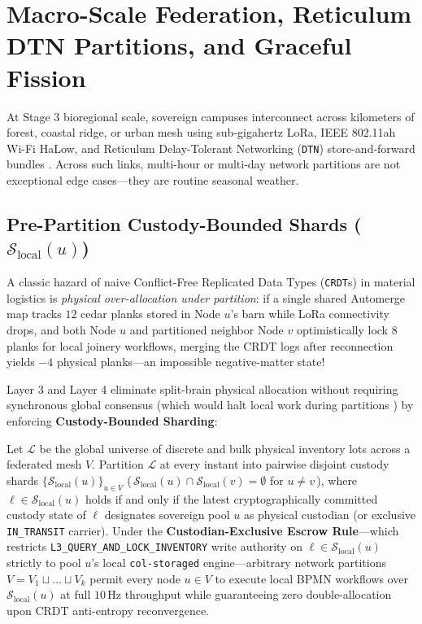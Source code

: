 \section{Macro-Scale Federation, Reticulum DTN Partitions, and Graceful Fission}
\label{sec:macro-scale-dtn-fission}

At Stage 3 bioregional scale, sovereign campuses interconnect across kilometers of forest,
coastal ridge, or urban mesh using sub-gigahertz LoRa, IEEE 802.11ah Wi-Fi HaLow, and Reticulum
Delay-Tolerant Networking (\texttt{DTN}) store-and-forward bundles \parencite{fall2003}. Across
such links, multi-hour or multi-day network partitions are not exceptional edge cases---they
are routine seasonal weather.

\subsection{Pre-Partition Custody-Bounded Shards ($\mathcal{S}_{\mathrm{local}}(u)$)}

A classic hazard of naive Conflict-Free Replicated Data Types (\texttt{CRDT}s)
\parencite{shapiro2011crdt} in material logistics is \emph{physical over-allocation under
partition}: if a single shared Automerge map tracks $12$ cedar planks stored in Node $u$'s barn
while LoRa connectivity drops, and both Node $u$ and partitioned neighbor Node $v$
optimistically lock $8$ planks for local joinery workflows, merging the CRDT logs after
reconnection yields $-4$ physical planks---an impossible negative-matter state!

Layer 3 and Layer 4 eliminate split-brain physical allocation without requiring synchronous
global consensus (which would halt local work during partitions \parencite{kleppmann2017designing})
by enforcing \textbf{Custody-Bounded Sharding}:

\begin{theorem}
\label{thm:custody-shard-safety}
Let $\mathcal{L}$ be the global universe of discrete and bulk physical inventory lots across a
federated mesh $V$. Partition $\mathcal{L}$ at every instant into pairwise disjoint custody
shards $\bigl\{\mathcal{S}_{\mathrm{local}}(u)\bigr\}_{u \in V}$
(\,$\mathcal{S}_{\mathrm{local}}(u) \cap \mathcal{S}_{\mathrm{local}}(v) = \emptyset$ for
$u \neq v$\,), where $\ell \in \mathcal{S}_{\mathrm{local}}(u)$ holds if and only if the latest
cryptographically committed custody state of $\ell$ designates sovereign pool $u$ as physical
custodian (or exclusive \texttt{IN\_TRANSIT} carrier). Under the \textbf{Custodian-Exclusive
Escrow Rule}---which restricts \texttt{L3\_QUERY\_AND\_LOCK\_INVENTORY} write authority on
$\ell \in \mathcal{S}_{\mathrm{local}}(u)$ strictly to pool $u$'s local \texttt{col-storaged}
engine---arbitrary network partitions $V = V_1 \sqcup \dots \sqcup V_k$ permit every node
$u \in V$ to execute local BPMN workflows over $\mathcal{S}_{\mathrm{local}}(u)$ at full
$10\,\mathrm{Hz}$ throughput while guaranteeing zero double-allocation upon CRDT anti-entropy
reconvergence.
\end{theorem}

